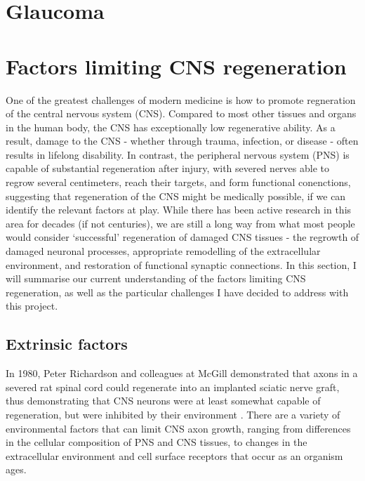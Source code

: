 \documentclass[
]{book}
\begin{document}

\hypertarget{glaucoma}{%
\section{Glaucoma}\label{glaucoma}}

\hypertarget{factors-limiting-cns-regeneration}{%
\section{Factors limiting CNS regeneration}\label{factors-limiting-cns-regeneration}}

One of the greatest challenges of modern medicine is how to promote regneration of the central nervous system (CNS). Compared to most other tissues and organs in the human body, the CNS has exceptionally low regenerative ability. As a result, damage to the CNS - whether through trauma, infection, or disease - often results in lifelong disability. In contrast, the peripheral nervous system (PNS) is capable of substantial regeneration after injury, with severed nerves able to regrow several centimeters, reach their targets, and form functional conenctions, suggesting that regeneration of the CNS might be medically possible, if we can identify the relevant factors at play. While there has been active research in this area for decades (if not centuries), we are still a long way from what most people would consider `successful' regeneration of damaged CNS tissues - the regrowth of damaged neuronal processes, appropriate remodelling of the extracellular environment, and restoration of functional synaptic connections. In this section, I will summarise our current understanding of the factors limiting CNS regeneration, as well as the particular challenges I have decided to address with this project.

\hypertarget{extrinsic-factors}{%
\subsection{Extrinsic factors}\label{extrinsic-factors}}

In 1980, Peter Richardson and colleagues at McGill demonstrated that axons in a severed rat spinal cord could regenerate into an implanted sciatic nerve graft, thus demonstrating that CNS neurons were at least somewhat capable of regeneration, but were inhibited by their environment \citep{richardsonAxonsCNSNeurones1980}. There are a variety of environmental factors that can limit CNS axon growth, ranging from differences in the cellular composition of PNS and CNS tissues, to changes in the extracellular environment and cell surface receptors that occur as an organism ages.
\end{document}
